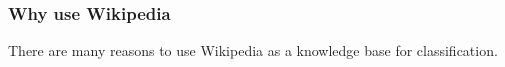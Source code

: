 \documentclass[11pt,english,a4paper]{article}
\begin{document}




\subsubsection*{Why use Wikipedia}
There are many reasons to use Wikipedia as a knowledge base for classification.
\end{document}
